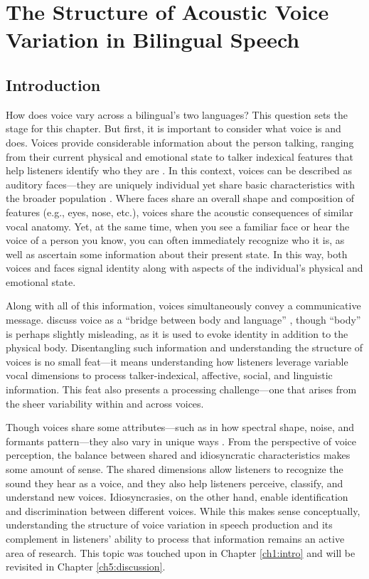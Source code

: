 \setcounter{chapter}{2}
\chapter{The Structure of Acoustic Voice Variation in Bilingual Speech}
\label{ch3:voice}

\section{Introduction}\label{ch3:sec:introduction}

How does voice vary across a bilingual's two languages? This question sets the stage for this chapter. But first, it is important to consider what voice is and does. Voices provide considerable information about the person talking, ranging from their current physical and emotional state to talker indexical features that help listeners identify who they are \citep{podesva_2015_voice}. In this context, voices can be described as auditory faces---they are uniquely individual yet share basic characteristics with the broader population \citep{belin_2004_voice}. Where faces share an overall shape and composition of features (e.g., eyes, nose, etc.), voices share the acoustic consequences of similar vocal anatomy. Yet, at the same time, when you see a familiar face or hear the voice of a person you know, you can often immediately recognize who it is, as well as ascertain some information about their present state. In this way, both voices and faces signal identity along with aspects of the individual's physical and emotional state. 

Along with all of this information, voices simultaneously convey a communicative message. \citeauthor{podesva_2015_voice} discuss voice as a ``bridge between body and language'' \citeyearpar[][p. 175]{podesva_2015_voice}, though ``body'' is perhaps slightly misleading, as it is used to evoke identity in addition to the physical body. Disentangling such information and understanding the structure of voices is no small feat---it means understanding how listeners leverage variable vocal dimensions to process talker-indexical, affective, social, and linguistic information. This feat also presents a processing challenge---one that arises from the sheer variability within and across voices. 

Though voices share some attributes---such as in how spectral shape, noise, and formants pattern---they also vary in unique ways \citep{lee_2019_acoustic}. From the perspective of voice perception, the balance between shared and idiosyncratic characteristics makes some amount of sense. The shared dimensions allow listeners to recognize the sound they hear as a voice, and they also help listeners perceive, classify, and understand new voices. Idiosyncrasies, on the other hand, enable identification and discrimination between different voices. While this makes sense conceptually, understanding the structure of voice variation in speech production and its complement in listeners' ability to process that information remains an active area of research. This topic was touched upon in Chapter \ref{ch1:intro} and will be revisited in Chapter \ref{ch5:discussion}.

